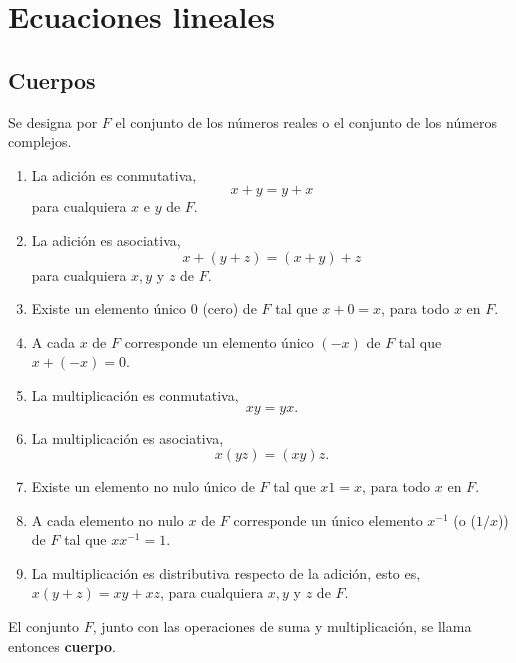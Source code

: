 \chapter{Ecuaciones lineales}

\section{Cuerpos}
Se designa por $F$ el conjunto de los números reales o el conjunto de los números complejos.

\begin{tcolorbox}
    \begin{enumerate}[\bfseries 1.]
	\item La adición es conmutativa,
	    $$x+y=y+x$$
	para cualquiera $x$ e $y$ de $F$.

	\item La adición es asociativa,
	    $$x+(y+z)=(x+y)+z$$
	para cualquiera $x,y$ y $z$ de $F$.

	\item Existe un elemento único $0$ (cero) de $F$ tal que $x+0=x$, para todo $x$ en $F$.

	\item A cada $x$ de $F$ corresponde un elemento único $(-x)$ de $F$ tal que $x+(-x)=0$.

	\item La multiplicación es conmutativa,
	    $$xy=yx.$$

	\item La multiplicación es asociativa,
	    $$x(yz)=(xy)z.$$

	\item Existe un elemento no nulo único de $F$ tal que $x1=x$, para todo $x$ en $F$.

	\item A cada elemento no nulo $x$ de $F$ corresponde un único elemento $x^{-1}$ (o ($1/x$)) de $F$ tal que $xx^{-1}=1.$

	\item La multiplicación es distributiva respecto de la adición, esto es, $x(y+z)=xy+xz$, para cualquiera $x,y$ y $z$ de $F$.
	
    \end{enumerate}
\end{tcolorbox}

\begin{tcolorbox}
    El conjunto $F$, junto con  las operaciones de suma y multiplicación, se llama entonces \textbf{cuerpo}.
\end{tcolorbox}

